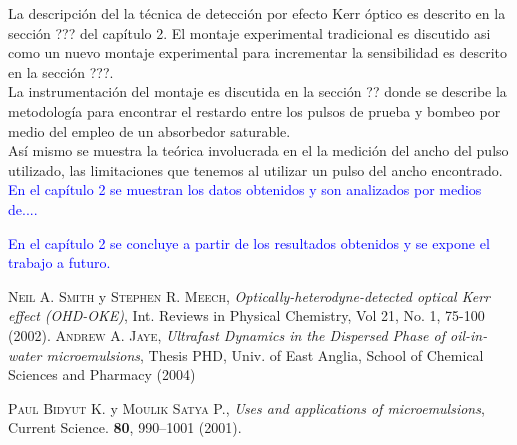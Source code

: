 La descripci\'on del la t\'ecnica de detecci\'on por efecto Kerr \'optico es descrito en la secci\'on ??? del cap\'itulo 2. El montaje experimental tradicional es discutido asi como un nuevo montaje experimental para incrementar la sensibilidad es descrito en la secci\'on ???.\\

La instrumentaci\'on del montaje es discutida en la secci\'on ?? donde se describe la metodología para encontrar el restardo entre los pulsos de prueba y bombeo por medio del empleo de un absorbedor saturable.\\

As\'i mismo se muestra la te\'orica involucrada en el la medici\'on del ancho del pulso utilizado, las limitaciones que tenemos al utilizar un pulso del ancho encontrado.\\

\textcolor{blue}{En el cap\'itulo 2 se muestran los datos obtenidos y son analizados por medios de....}

\textcolor{blue}{En el cap\'itulo 2 se concluye a partir de los resultados obtenidos y se expone el trabajo a futuro.}


\begin{thebibliography}{2}
 \textsc{Neil A. Smith} y \textsc{Stephen R. Meech}, \textit{Optically-heterodyne-detected optical Kerr effect (OHD-OKE)}, Int. Reviews in Physical Chemistry, Vol 21, No. 1, 75-100 (2002).
 \textsc{Andrew A. Jaye}, \textit{Ultrafast Dynamics in the Dispersed Phase of oil-in-water microemulsions}, Thesis PHD, Univ. of East Anglia, School of Chemical Sciences and Pharmacy (2004)

 \textsc{Paul Bidyut K.} y \textsc{Moulik Satya P.},
\textit{Uses and applications of microemulsions}, Current Science. {\bf 80}, 990–1001 (2001).
\end{thebibliography}
